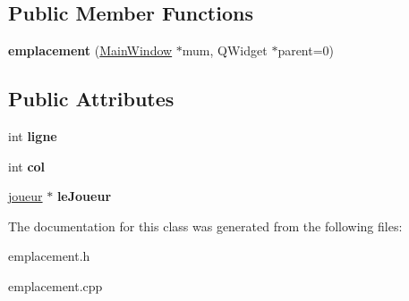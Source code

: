 \subsection*{Public Member Functions}
\begin{DoxyCompactItemize}
\item 
\hypertarget{classemplacement_ad52a33b25cbb300d91e13906db2a7cc3}{{\bfseries emplacement} (\hyperlink{class_main_window}{Main\-Window} $\ast$mum, Q\-Widget $\ast$parent=0)}\label{classemplacement_ad52a33b25cbb300d91e13906db2a7cc3}

\end{DoxyCompactItemize}
\subsection*{Public Attributes}
\begin{DoxyCompactItemize}
\item 
\hypertarget{classemplacement_aa0e8e131a1d8325f2245c56f8d2e6e8c}{int {\bfseries ligne}}\label{classemplacement_aa0e8e131a1d8325f2245c56f8d2e6e8c}

\item 
\hypertarget{classemplacement_ac0af10e9e8d40e815a8b9633019406b1}{int {\bfseries col}}\label{classemplacement_ac0af10e9e8d40e815a8b9633019406b1}

\item 
\hypertarget{classemplacement_ae496fbda5429d0d37f38c2c45f6b88b6}{\hyperlink{classjoueur}{joueur} $\ast$ {\bfseries le\-Joueur}}\label{classemplacement_ae496fbda5429d0d37f38c2c45f6b88b6}

\end{DoxyCompactItemize}


The documentation for this class was generated from the following files\-:\begin{DoxyCompactItemize}
\item 
emplacement.\-h\item 
emplacement.\-cpp\end{DoxyCompactItemize}
